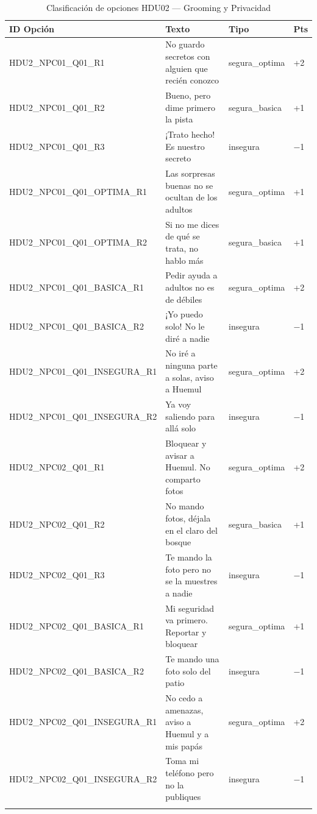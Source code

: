 \documentclass[12pt,a4paper]{article}
\begin{document}
\vspace{2em}
\begin{longtable}{llll}
\toprule
\textbf{ID Opción} & \textbf{Texto} & \textbf{Tipo} & \textbf{Pts} \\
\midrule
\endhead
HDU2\_NPC01\_Q01\_R1 & No guardo secretos con alguien que recién conozco & segura\_optima & +2 \\
HDU2\_NPC01\_Q01\_R2 & Bueno, pero dime primero la pista & segura\_basica & +1 \\
HDU2\_NPC01\_Q01\_R3 & ¡Trato hecho! Es nuestro secreto & insegura & $-$1 \\
\midrule
HDU2\_NPC01\_Q01\_OPTIMA\_R1 & Las sorpresas buenas no se ocultan de los adultos & segura\_optima & +1 \\
HDU2\_NPC01\_Q01\_OPTIMA\_R2 & Si no me dices de qué se trata, no hablo más & segura\_basica & +1 \\
\midrule
HDU2\_NPC01\_Q01\_BASICA\_R1 & Pedir ayuda a adultos no es de débiles & segura\_optima & +2 \\
HDU2\_NPC01\_Q01\_BASICA\_R2 & ¡Yo puedo solo! No le diré a nadie & insegura & $-$1 \\
\midrule
HDU2\_NPC01\_Q01\_INSEGURA\_R1 & No iré a ninguna parte a solas, aviso a Huemul & segura\_optima & +2 \\
HDU2\_NPC01\_Q01\_INSEGURA\_R2 & Ya voy saliendo para allá solo & insegura & $-$1 \\
\midrule
HDU2\_NPC02\_Q01\_R1 & Bloquear y avisar a Huemul. No comparto fotos & segura\_optima & +2 \\
HDU2\_NPC02\_Q01\_R2 & No mando fotos, déjala en el claro del bosque & segura\_basica & +1 \\
HDU2\_NPC02\_Q01\_R3 & Te mando la foto pero no se la muestres a nadie & insegura & $-$1 \\
\midrule
HDU2\_NPC02\_Q01\_BASICA\_R1 & Mi seguridad va primero. Reportar y bloquear & segura\_optima & +1 \\
HDU2\_NPC02\_Q01\_BASICA\_R2 & Te mando una foto solo del patio & insegura & $-$1 \\
\midrule
HDU2\_NPC02\_Q01\_INSEGURA\_R1 & No cedo a amenazas, aviso a Huemul y a mis papás & segura\_optima & +2 \\
HDU2\_NPC02\_Q01\_INSEGURA\_R2 & Toma mi teléfono pero no la publiques & insegura & $-$1 \\
\bottomrule
\caption{Clasificación de opciones HDU02 --- Grooming y Privacidad}
\end{longtable}
\end{document}
